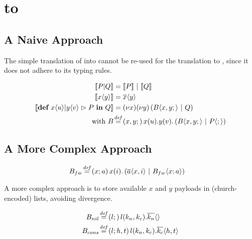 \section{\CoreJoinCalc to \ActorPiCalc}

\subsection{A Naive Approach}

The simple translation of \joincalc into \asyncpicalc \cite{fournet_reflexive_1996} cannot be re-used for the translation to \actorpicalc,
since it does not adhere to its typing rules.

\begin{align*}
  \encMJtoAP{P \jpar Q}
  &= \encMJtoAP{P} \apar \encMJtoAP{Q}
  \\
  \encMJtoAP{\jsnd{x}{y}}
  &= \asnd{x}{y}
  \\
  \encMJtoAP{\jdef{\jrct{\jrcv{x}{u} \jpat \jrcv{y}{v}}{P}}{Q}}
  &= \anew{x}{\anew{y}{\parens{\ains{B}{x, y}{} \apar Q}}}
  \\
  \text{with }
  \adef*{B}{x,y}{}{\arcv{x}{u} . \arcv{y}{v} . \parens{\ains{B}{x, y}{} \apar \ains{P}{}{}}} \\
\end{align*}



\subsection{A More Complex Approach}


\begin{align*}
  \adef*{B_{fw}}{x}{a}{\arcv{x}{i} . \parens{\asnd{a}{x,i} \apar \ains{B_{fw}}{x}{a}}}
\end{align*}



A more complex approach is to store available $x$ and $y$ payloads
in (church-encoded) lists, avoiding divergence.


\begin{align*}
  \adef*{B_{nil}}{l}{}{\arcv{l}{k_n,k_c} . \asnd{k_n}{}}
  \\
  \adef*{B_{cons}}{l}{h,t}{\arcv{l}{k_n,k_c} . \asnd{k_c}{h,t}}
\end{align*}

